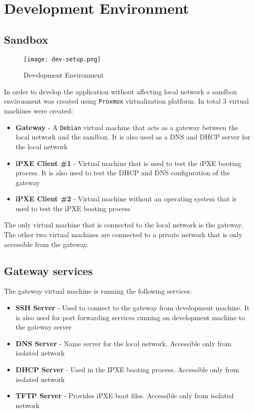 \documentclass[../main.tex]{subfiles}
\begin{document}
\section{Development Environment}

\subsection{Sandbox}

\begin{figure}[H]
  \centering
  \texttt{[image: dev-setup.png]}
  \caption{Development Environment}
  \label{fig:dev-setup}
\end{figure}

In order to develop the application without affecting local network a sandbox environment was created using \texttt{Proxmox} \cite{proxmox} virtualization platform.
In total 3 virtual machines were created:

\begin{itemize}
  \item \textbf{Gateway} - A \texttt{Debian} \cite{debian} virtual machine that acts as a gateway between the local network and the sandbox. It is also used as a DNS and DHCP server for the local network
  \item \textbf{iPXE Client \#1} - Virtual machine that is used to test the iPXE booting process. It is also used to test the DHCP and DNS configuration of the gateway
  \item \textbf{iPXE Client \#2} - Virtual machine without an operating system that is used to test the iPXE booting process
\end{itemize}

The only virtual machine that is connected to the local network is the gateway. The other two virtual machines are connected to a private network that is only accessible from the gateway.

\subsection{Gateway services}

The gateway virtual machine is running the following services:

\begin{itemize}
  \item \textbf{SSH Server} - Used to connect to the gateway from development machine. It is also used for port forwarding services running on development machine to the gateway server
  \item \textbf{DNS Server} - Name server for the local network. Accessible only from isolated network
  \item \textbf{DHCP Server} - Used in the IPXE booting process. Accessible only from isolated network
  \item \textbf{TFTP Server} - Provides iPXE boot files. Accessible only from isolated network
\end{itemize}
\end{document}
